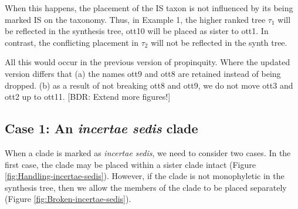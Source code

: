 \documentclass[english]{article}
\begin{document}
When this happens, the placement of the IS taxon is not influenced by
its being marked IS on the taxonomy.
Thus, in Example 1, the higher
ranked tree $\tau_{1}$ will be reflected in the synthesis tree, ott10
will be placed as sister to ott1.
In contrast, the conflicting
placement in $\tau_{2}$ will not be reflected in the synth tree.

All this would occur in the previous version of propinquity.
Where the
updated version differs that (a) the names ott9 and ott8 are retained
instead of being dropped.
(b) as a result of not breaking ott8 and
ott9, we do not move ott3 and ott2 up to ott11.
{[}BDR: Extend more
figures!{]}

\subsection{Case 1: An \emph{incertae sedis} clade}

When a clade is marked as \emph{incertae sedis}, we need to consider
two cases.
In the first case, the clade may be placed within a sister
clade intact (Figure \ref{fig:Handling-incertae-sedis}).
However, if
the clade is not monophyletic in the synthesis tree, then we allow the
members of the clade to be placed separately (Figure \ref{fig:Broken-incertae-sedis}).
\end{document}
